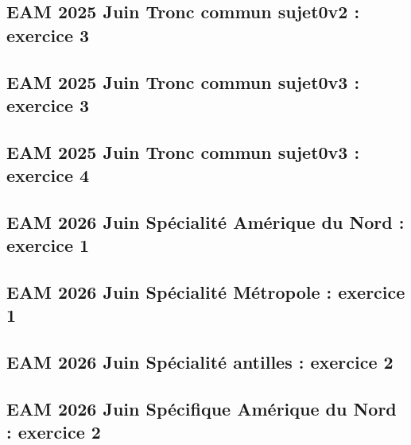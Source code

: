 \documentclass[lang=fr,edition=teacher,layout=sheet]{mxbook}
\begin{document}
\subsection*{EAM 2025 Juin Tronc commun sujet0v2 : exercice 3}
\begingroup\endgroup
\par\bigskip
{}\subsection*{EAM 2025 Juin Tronc commun sujet0v3 : exercice 3}
\begingroup\endgroup
\par\bigskip
{}\subsection*{EAM 2025 Juin Tronc commun sujet0v3 : exercice 4}
\begingroup\endgroup
\par\bigskip
{}\subsection*{EAM 2026 Juin Spécialité Amérique du Nord : exercice 1}
\begingroup\endgroup
\par\bigskip
{}\subsection*{EAM 2026 Juin Spécialité Métropole : exercice 1}
\begingroup\endgroup
\par\bigskip
{}\subsection*{EAM 2026 Juin Spécialité antilles : exercice 2}
\begingroup\endgroup
\par\bigskip
{}\subsection*{EAM 2026 Juin Spécifique Amérique du Nord : exercice 2}
\end{document}
